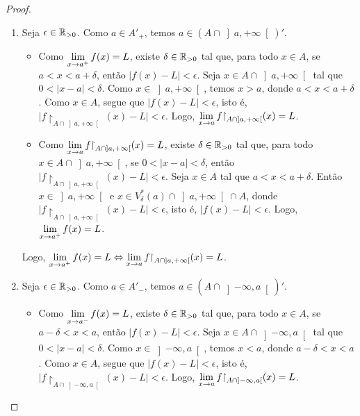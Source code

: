 \begin{proof}
    \leavevmode
        \begin{enumerate}[leftmargin=*, align=left, label=\textbf{(\alph*)}]
            \item Seja $\epsilon \in \mathbb{R}_{>0}$. Como $a \in A'_+$, temos $a \in (A \cap \left]a,+\infty\right[)'$.
                \begin{itemize}
                    \item[($\Rightarrow$)] Como $\displaystyle \lim_{x \to a^+} f(x) = L$, existe $\delta \in \mathbb{R}_{>0}$ tal que, para todo $x \in A$, se $a < x < a+\delta$, então $|f(x) - L| < \epsilon$. Seja $x \in A \cap \left]a,+\infty\right[$ tal que $0 < |x-a| < \delta$. Como $x \in \left]a,+\infty\right[$, temos $x > a$, donde $a < x < a+\delta$. Como $x \in A$, segue que $|f(x) - L| < \epsilon$, isto é, $|f \restriction_{A \cap \left]a,+\infty\right[}(x) - L| < \epsilon$. Logo, $\ds \lim_{x \to a} f \restriction_{A \cap \left]a,+\infty\right[}(x) = L$.
                    \item[($\Leftarrow$)] Como $\ds \lim_{x \to a} f \restriction_{A \cap \left]a,+\infty\right[}(x) = L$, existe $\delta \in \mathbb{R}_{>0}$ tal que, para todo $x \in A \cap \left]a,+\infty\right[$, se $0 < |x-a| < \delta$, então $|f \restriction_{A \cap \left]a,+\infty\right[}(x) - L| < \epsilon$. Seja $x \in A$ tal que $a < x < a+\delta$. Então $x \in \left]a,+\infty\right[$ e $x \in V^*_{\delta}(a) \cap \left]a,+\infty\right[ \cap A$, donde $|f \restriction_{A \cap \left]a,+\infty\right[}(x) - L| < \epsilon$, isto é, $|f(x) - L| < \epsilon$. Logo, $\displaystyle \lim_{x \to a^+} f(x) = L$.
                \end{itemize}
            Logo, $\ds \lim_{x \to a^+} f(x) = L \Leftrightarrow \lim_{x \to a} f \restriction_{A \cap \left]a,+\infty \right[ } (x) = L$. \blackproof
            \item Seja $\epsilon \in \mathbb{R}_{>0}$. Como $a \in A'_-$, temos $a \in (A \cap \left]-\infty,a\right[)'$.
                \begin{itemize}
                    \item[($\Rightarrow$)] Como $\displaystyle \lim_{x \to a^-} f(x) = L$, existe $\delta \in \mathbb{R}_{>0}$ tal que, para todo $x \in A$, se $a-\delta < x < a$, então $|f(x) - L| < \epsilon$. Seja $x \in A \cap \left]-\infty,a\right[$ tal que $0 < |x-a| < \delta$. Como $x \in \left]-\infty,a\right[$, temos $x < a$, donde $a-\delta < x < a$. Como $x \in A$, segue que $|f(x) - L| < \epsilon$, isto é, $|f \restriction_{A \cap \left]-\infty,a\right[}(x) - L| < \epsilon$. Logo, $\ds \lim_{x \to a} f \restriction_{A \cap \left]-\infty,a\right[}(x) = L$.

\end{itemize}
\end{enumerate}
\end{proof}
